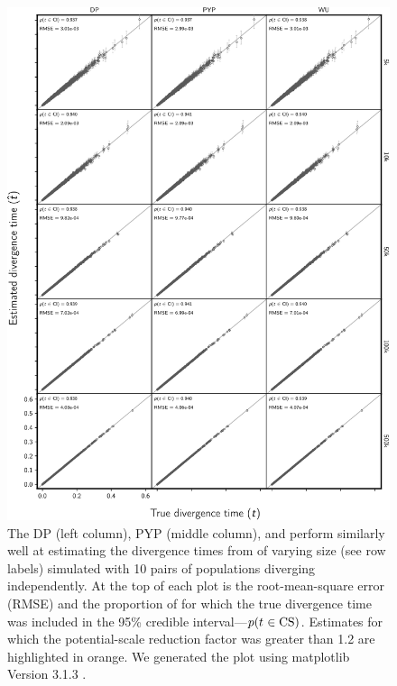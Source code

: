 \begin{figure}[htbp]
    \begin{center}
        \includegraphics[width=\textwidth,height=0.9\textheight,keepaspectratio]{../images/from-project-repo/nchars-div-time-scatter-cropped.pdf}
        \captionsetup{name=Figure S, labelformat=noSpace, listformat=sFigList}
        \caption{\footnotesize
        The DP (left column),
        PYP (middle column),
        and
        \wunif
        perform similarly well at estimating the divergence times from
        \datasets of varying size (see row labels) simulated with
        10 pairs of populations diverging independently.
        At the top of each plot is the root-mean-square error (RMSE)
        and
        the proportion of \datasets for which the true divergence time was
        included in the 95\% credible interval---$p(t_{} \in
        \textrm{CS})$.
        Estimates for which the potential-scale reduction factor was greater
        than 1.2 \citep{Brooks1998} are highlighted in orange.
        We generated the plot using matplotlib Version 3.1.3
        \citep{matplotlib}.
        }
        \label{fig:divtimegridbysize}
    \end{center}
\end{figure}

